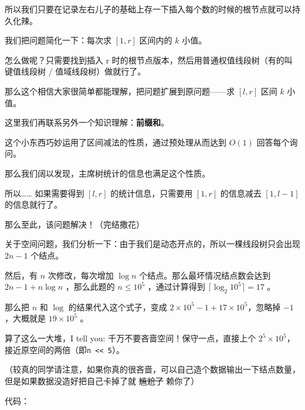 所以我们只要在记录左右儿子的基础上存一下插入每个数的时候的根节点就可以持久化辣。

我们把问题简化一下：每次求 $[1,r]$ 区间内的 $k$ 小值。  

怎么做呢？只需要找到插入 r 时的根节点版本，然后用普通权值线段树（有的叫键值线段树 / 值域线段树）做就行了。

那么这个相信大家很简单都能理解，把问题扩展到原问题——求 $[l,r]$ 区间 $k$ 小值。  

这里我们再联系另外一个知识理解：\textbf{前缀和}。  

这个小东西巧妙运用了区间减法的性质，通过预处理从而达到 $O(1)$ 回答每个询问。

那么我们阔以发现，主席树统计的信息也满足这个性质。  

所以…… 如果需要得到 $[l,r]$ 的统计信息，只需要用 $[1,r]$ 的信息减去 $[1,l - 1]$ 的信息就行了。

那么至此，该问题解决！（完结撒花）

关于空间问题，我们分析一下：由于我们是动态开点的，所以一棵线段树只会出现 $2n-1$ 个结点。  

然后，有 $n$ 次修改，每次增加 $\log{n}$ 个结点。那么最坏情况结点数会达到 $2n-1+n\log{n}$ ，那么此题的 $n \leq 10^5$ ，通过计算得到 $\lceil\log_2{10^5}\rceil = 17$ 。  

那么把 $n$ 和 $\log$ 的结果代入这个式子，变成 $2\times 10^5-1+17\times 10^5$，忽略掉 $-1$ ，大概就是 $19\times 10^5$ 。

算了这么一大堆，I tell you: 千万不要吝啬空间！保守一点，直接上个 $2^5\times 10^5$，接近原空间的两倍（即\texttt{n << 5}）。  

（较真的同学请注意，如果你真的很吝啬，可以自己造个数据输出一下结点数量，但是如果数据没造好把自己卡掉了就 \sout{尴尬了} 赖你了）

代码：

